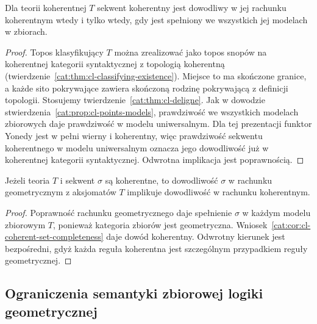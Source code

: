 \begin{wniosek}\label{cat:cor:cl-coherent-set-completeness}
Dla teorii koherentnej $T$ sekwent koherentny jest dowodliwy w jej rachunku koherentnym wtedy i tylko wtedy, gdy jest spełniony we wszystkich jej modelach w zbiorach.
\end{wniosek}
\begin{proof}
Topos klasyfikujący $T$ można zrealizować jako topos snopów na koherentnej kategorii syntaktycznej z topologią koherentną (twierdzenie~\ref{cat:thm:cl-classifying-existence}). Miejsce to ma skończone granice, a każde sito pokrywające zawiera skończoną rodzinę pokrywającą z definicji topologii. Stosujemy twierdzenie~\ref{cat:thm:cl-deligne}. Jak w dowodzie stwierdzenia~\ref{cat:prop:cl-points-models}, prawdziwość we wszystkich modelach zbiorowych daje prawdziwość w modelu uniwersalnym. Dla tej prezentacji funktor Yonedy jest w pełni wierny i koherentny, więc prawdziwość sekwentu koherentnego w modelu uniwersalnym oznacza jego dowodliwość już w koherentnej kategorii syntaktycznej. Odwrotna implikacja jest poprawnością.
\end{proof}

\begin{wniosek}\label{cat:cor:cl-coherent-conservative}
Jeżeli teoria $T$ i sekwent $\sigma$ są koherentne, to dowodliwość $\sigma$ w rachunku geometrycznym z aksjomatów $T$ implikuje dowodliwość w rachunku koherentnym.
\end{wniosek}
\begin{proof}
Poprawność rachunku geometrycznego daje spełnienie $\sigma$ w każdym modelu zbiorowym $T$, ponieważ kategoria zbiorów jest geometryczna. Wniosek~\ref{cat:cor:cl-coherent-set-completeness} daje dowód koherentny. Odwrotny kierunek jest bezpośredni, gdyż każda reguła koherentna jest szczególnym przypadkiem reguły geometrycznej.
\end{proof}

\subsection{Ograniczenia semantyki zbiorowej logiki geometrycznej}

